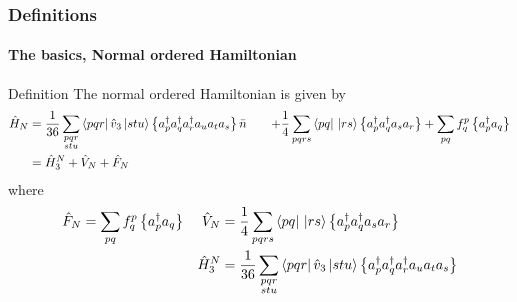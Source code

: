 \begin{frame}[fragile]
    \frametitle{Definitions}
    \framesubtitle{The basics, Normal ordered Hamiltonian}

    \small
    \begin{block}{Definition}
    The normal ordered Hamiltonian is given by
    \begin{align*}
        \hat{H}_N &= 
            \frac{1}{36} \sum_{\substack{
                        pqr \\
                        stu}}
                 \bra{pqr}\hat{v}_3\,|{stu}\rangle 
                    \left\{a^\dagger_p a^\dagger_q a^\dagger_r a_u a_t a_s\right\} \bar{n}
        & \quad + 
            \frac{1}{4} \sum_{pqrs} \bra{pq}\,|{rs}\rangle \left\{a^\dagger_p a^\dagger_q a_s  a_r\right\} 
            + \sum_{pq} f_q^p \left\{a^\dagger_p a_q\right\} \\
        &= \hat{H}_3^N + \hat{V}_N + \hat{F}_N
    \end{align*}
    where
    \begin{subequations}
    \begin{align*}
        \hat{F}_N &= \sum_{pq} f_q^p \left\{a^\dagger_p a_q\right\} &
        \hat{V}_N &= \frac{1}{4} \sum_{pqrs} \bra{pq}\,|{rs}\rangle \left\{a^\dagger_p a^\dagger_q a_s  a_r\right\} \\
        && \hat{H}_3^N &= 
                \frac{1}{36} \sum_{\substack{
                            pqr \\
                            stu}}
                     \bra{pqr}\hat{v}_3\,|{stu}\rangle 
                        \left\{a^\dagger_p a^\dagger_q a^\dagger_r a_u a_t a_s\right\}
    \end{align*}
    \end{subequations}
    \end{block}
\end{frame}
